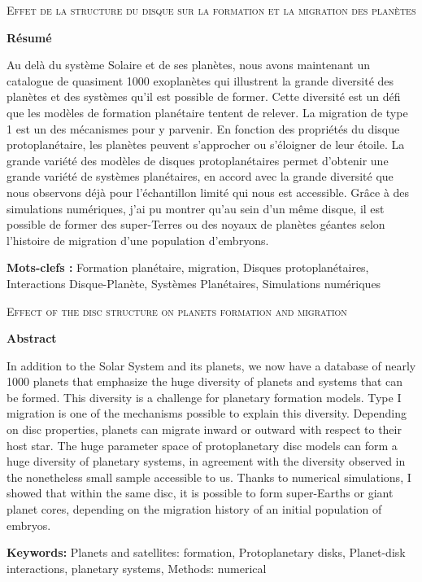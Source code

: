 \documentclass[a4paper, 12pt]{report}
\begin{document}
\thispagestyle{empty}

\vfill

\begin{center}
\textsc{Effet de la structure du disque sur la formation et la migration des planètes}
\end{center}

\begin{center}
\textbf{Résumé}
\end{center}

Au delà du système Solaire et de ses planètes, nous avons maintenant un catalogue de quasiment 1000 exoplanètes qui illustrent la grande diversité des planètes et des systèmes qu'il est possible de former. Cette diversité est un défi que les modèles de formation planétaire tentent de relever. La migration de type 1 est un des mécanismes pour y parvenir. En fonction des propriétés du disque protoplanétaire, les planètes peuvent s'approcher ou s'éloigner de leur étoile. La grande variété des modèles de disques protoplanétaires permet d'obtenir une grande variété de systèmes planétaires, en accord avec la grande diversité que nous observons déjà pour l'échantillon limité qui nous est accessible. Grâce à des simulations numériques, j'ai pu montrer qu'au sein d'un même disque, il est possible de former des super-Terres ou des noyaux de planètes géantes selon l'histoire de migration d'une population d'embryons.

\bigskip

\noindent\textbf{Mots-clefs : } Formation planétaire, migration, Disques protoplanétaires, Interactions Disque-Planète, Systèmes Planétaires, Simulations numériques

\bigskip

\noindent\hspace*{0.25\textwidth}\hrulefill\hspace*{0.25\textwidth}

\vfill


\begin{center}
\textsc{Effect of the disc structure on planets formation and migration}
\end{center}

\begin{center}
\textbf{Abstract}
\end{center}

In addition to the Solar System and its planets, we now have a database of nearly 1000 planets that emphasize the huge diversity of planets and systems that can be formed. This diversity is a challenge for planetary formation models. Type I migration is one of the mechanisms possible to explain this diversity. Depending on disc properties, planets can migrate inward or outward with respect to their host star. The huge parameter space of protoplanetary disc models can form a huge diversity of planetary systems, in agreement with the diversity observed in the nonetheless small sample accessible to us. Thanks to numerical simulations, I showed that within the same disc, it is possible to form super-Earths or giant planet cores, depending on the migration history of an initial population of embryos.

\bigskip

\noindent\textbf{Keywords: } Planets and satellites: formation, Protoplanetary disks, Planet-disk interactions, planetary systems, Methods: numerical

\vfill
\end{document}
